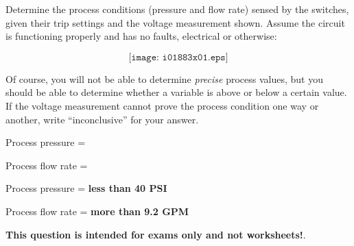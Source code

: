 

Determine the process conditions (pressure and flow rate) sensed by the switches, given their trip settings and the voltage measurement shown.  Assume the circuit is functioning properly and has no faults, electrical or otherwise:

$$\texttt{[image: i01883x01.eps]}$$

Of course, you will not be able to determine {\it precise} process values, but you should be able to determine whether a variable is above or below a certain value.  If the voltage measurement cannot prove the process condition one way or another, write ``inconclusive'' for your answer.

\vskip 30pt

Process pressure = 

\vskip 30pt

Process flow rate = 







Process pressure = {\bf less than 40 PSI}

Process flow rate = {\bf more than 9.2 GPM}







{\bf This question is intended for exams only and not worksheets!}.


